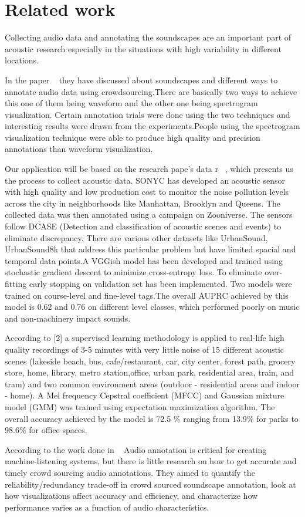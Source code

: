 
\section{Related work}
Collecting audio data and annotating the soundscapes are an important part of acoustic research especially in the situations with high variability in different locations.

In the paper ~\cite{5} they have discussed about soundscapes and different ways to annotate audio data using crowdsourcing.There are basically two ways to achieve this one of them being waveform and the other one being spectrogram visualization. Certain annotation trials were done using the two techniques and interesting results were drawn from the experiments.People using the spectrogram visualization technique were able to produce high quality and precision annotations than waveform visualization.    

Our application will be based on the research pape's data r~ \cite{4}, which presents us the process to collect acoustic data. SONYC has developed an acoustic sensor with high quality and low production cost to monitor the noise pollution levels across the city in neighborhoods like Manhattan, Brooklyn and Queens. The collected data was then annotated using a campaign on Zooniverse. The sensors follow DCASE (Detection and classification of acoustic scenes and events) to eliminate discrepancy. There are various other datasets like UrbanSound, UrbanSound8k that address this particular problem but have limited spacial and temporal data points.A VGGish model has been developed and trained using stochastic gradient descent to minimize cross-entropy loss. To eliminate over-fitting early stopping on validation set has been implemented. Two models were trained on course-level and fine-level tags.The overall AUPRC achieved by this model is 0.62 and 0.76 on different level classes, which performed poorly on music and non-machinery impact sounds.

According to [2] a supervised learning methodology is applied to real-life high quality recordings of 3-5 minutes with very little noise of 15 different acoustic scenes (lakeside beach, bus, cafe/restaurant, car, city center, forest path, grocery store, home, library, metro station,office, urban park, residential area, train, and tram) and two common environment areas (outdoor - residential areas and indoor - home). A Mel frequency Cepstral coefficient (MFCC) and Gaussian mixture model (GMM) was trained using expectation maximization algorithm. The overall accuracy achieved by the model is 72.5 \% ranging from 13.9\% for parks to 98.6\% for office spaces.

According to the work done in ~\cite{4} Audio annotation is critical for creating machine-listening systems, but there is little research on how to get accurate and timely crowd sourcing audio annotations. They aimed to quantify the reliability/redundancy trade-off in crowd sourced soundscape annotation, look at how visualizations affect accuracy and efficiency, and characterize how performance varies as a function of audio characteristics.

